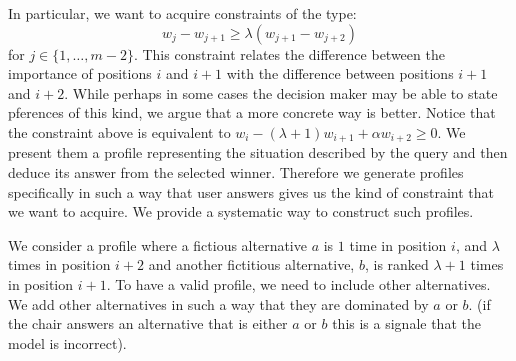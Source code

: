 \documentclass[12pt]{article}
\begin{document}
In particular, we want to acquire constraints of the type:
\[ w_{j} - w_{j+1} \geq \lambda (w_{j+1} - w_{j+2}) \] 
for $j \in \{1,\ldots,m-2\}$.
This constraint relates the difference between the importance of positions $i$ and $i+1$ with the difference between positions $i+1$ and $i+2$.
While perhaps in some cases the decision maker may be able to state pferences of this kind, we argue that a more concrete way is better.
Notice that the constraint above is equivalent to $w_{i} - (\lambda+1) w_{i+1} + \alpha w_{i+2} \geq 0$.
We present them a profile representing the situation described by the query and then deduce its answer from the selected winner. 
Therefore we generate profiles specifically in such a way that user answers gives us the kind of constraint that we want to acquire.
We provide a systematic way to construct such profiles.  %

We consider a profile where a fictious alternative $a$ is $1$ time in position $i$, and $\lambda$ times 
in position $i+2$ and another fictitious alternative, $b$, is ranked $\lambda+1$ times in position $i+1$.
To have a valid profile, we need to include other alternatives.
We add other alternatives in such a way that they are dominated by $a$ or $b$. 
(if the chair answers an alternative that is either $a$ or $b$ this is a signale that the model is incorrect).
\end{document}
